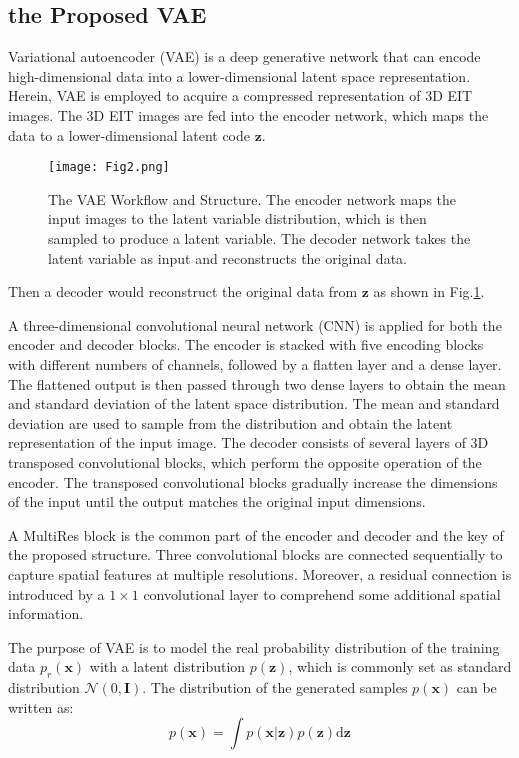 \documentclass[journal,twoside,web]{ieeecolor}
\begin{document}
\subsection{the Proposed VAE}
Variational autoencoder (VAE) is a deep generative network \cite{kingma2013auto} that can encode high-dimensional data into a lower-dimensional latent space representation. Herein, VAE is employed to acquire a compressed representation of 3D EIT images. The 3D EIT images are fed into the encoder network, which maps the data to a lower-dimensional latent code $\bm z$. 
\begin{figure}[!h]
	\centering
	\texttt{[image: Fig2.png]}
	\caption{The VAE Workflow and Structure. The encoder network maps the input images to the latent variable distribution, which is then sampled to produce a latent variable. The decoder network takes the latent variable as input and reconstructs the original data.}
	\label{flow}
\end{figure}
Then a decoder would reconstruct the original data from $\bm z$ as shown in Fig.\ref{flow}. 

A three-dimensional convolutional neural network (CNN) is applied for both the encoder and decoder blocks. The encoder is stacked with five encoding blocks with different numbers of channels, followed by a flatten layer and a dense layer. The flattened output is then passed through two dense layers to obtain the mean and standard deviation of the latent space distribution. The mean and standard deviation are used to sample from the distribution and obtain the latent representation of the input image. The decoder consists of several layers of 3D transposed convolutional blocks, which perform the opposite operation of the encoder. The transposed convolutional blocks gradually increase the dimensions of the input until the output matches the original input dimensions.

A MultiRes block\cite{ibtehaz2020multiresunet} is the common part of the encoder and decoder and the key of the proposed structure. Three convolutional blocks are connected sequentially to capture spatial features at multiple resolutions. Moreover, a residual connection is introduced by a $1 \times 1$ convolutional layer to comprehend some additional spatial information. 

The purpose of VAE is to model the real probability distribution of the training data $p_{r}(\bm x)$ with a latent distribution $p(\bm z)$, which is commonly set as standard distribution $\mathcal{N}(0, \bm I)$. The distribution of the generated samples $p(\bm x)$ can be written as: 
\begin{equation}
	p(\bm x) = \int p(\bm x|\bm z) p(\bm z) \mathrm{d}\bm z
\end{equation}
\end{document}
